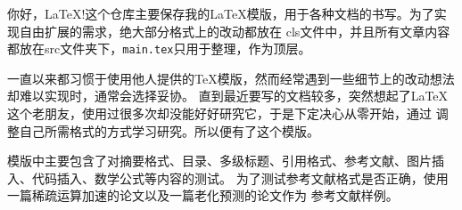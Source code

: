 你好，\LaTeX!这个仓库主要保存我的\LaTeX 模版，用于各种文档的书写。为了实现自由扩展的需求，绝大部分格式上的改动都放在
cls文件中，并且所有文章内容都放在src文件夹下，\verb!main.tex!只用于整理，作为顶层。

一直以来都习惯于使用他人提供的\TeX 模版，然而经常遇到一些细节上的改动想法却难以实现时，通常会选择妥协。
直到最近要写的文档较多，突然想起了\LaTeX 这个老朋友，使用过很多次却没能好好研究它，于是下定决心从零开始，通过
调整自己所需格式的方式学习研究。所以便有了这个模版。

模版中主要包含了对摘要格式、目录、多级标题、引用格式、参考文献、图片插入、代码插入、数学公式等内容的测试。
为了测试参考文献格式是否正确，使用一篇稀疏运算加速的论文以及一篇老化预测的论文作为
参考文献样例。
